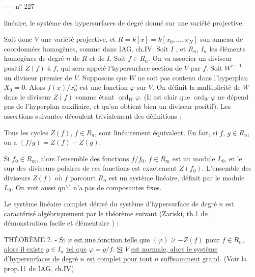 
--  -- \hfill n° 227

linéaire, le système des hypersurfaces de degré donné sur une variété projective.

Soit donc $V$ une variété projective, et $R=k[x]=k[x_0,\ldots,x_N]$ son anneau de coordonnées homogènes, comme dans IAG, ch.IV. Soit $I$ , et $R_n$, $I_n$ les éléments homogènes de degré $n$ de $R$ et de $I$. Soit $f\in R_n$. On va associer un diviseur positif $Z(f)$ à $f$, qui sera appelé l'hypersurface section de $V$ par $f$. Soit $W^{r-1}$ un diviseur premier de $V$. Supposons que $W$ ne soit pas contenu dans l'hyperplan $X_0=0$. Alors $f(x)/x_0^n$ est une fonction $\varphi$ sur $V$. On définit la multiplicité de $W$ dans le diviseur $Z(f)$ comme étant $\operatorname{ord}_W\varphi$. (Il est clair que $\operatorname{ord}_W\varphi$ ne dépend pas de l'hyperplan auxiliaire, et qu'on obtient bien un diviseur positif). Les assertions suivantes découlent trivialement des définitions :

Tous les cycles $Z(f)$, $f\in R_n$, sont linéairement équivalent. En fait, si $f$, $g\in R_n$, on a $(f/g)=Z(f)-Z(g)$.

Si $f_0\in R_m$, alors l'ensemble des fonctions $f/f_0$, $f\in R_m$ est un module $L_0$, et le sup des diviseurs polaires de ces fonctions est exactement $Z(f_0)$. L'ensemble des diviseurs $Z(f)$ où $f$ parcourt $R_n$ est un système linéaire, définit par le module $L_0$. On voit aussi qu'il n'a pas de composantes fixes.

Le système linéaire complet dérivé du système d'hypersurface de degré $n$ est caractérisé algébriquement par le théorème suivant (Zariski, th.1 de , démonstration facile et élémentaire ) :

THÉORÈME 2. - \uline{Si} $\varphi$ \uline{est une fonction telle que} $(\varphi)\geq-Z(f)$ \uline{pour} $f\in R_n$, \uline{alors il existe} $g\in I_n$ \uline{tel que} $\varphi=g/f$. \uline{Si} $V$ \uline{est normale, alors le système d'hypersurfaces de degré} $n$ \uline{est complet pour tout} $n$ \uline{suffisamment grand}. (Voir la prop.11 de IAG, ch.IV).

